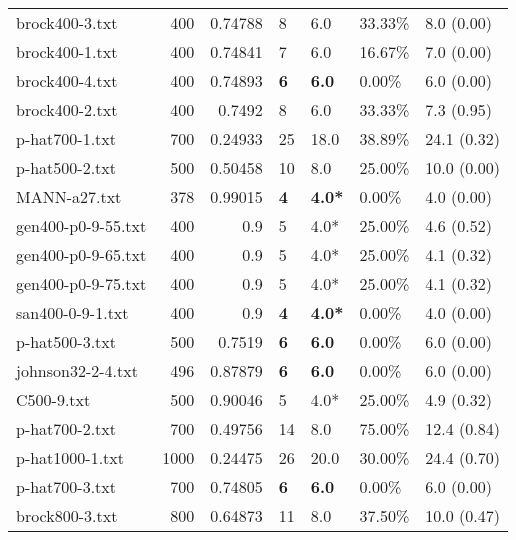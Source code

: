 \begin{table}[h]
\begin{tabular}{lrrllll}
 brock400-3.txt     &     400 &     0.74788 & 8            & 6.0             & 33.33\%  & 8.0 (0.00)     \\
 brock400-1.txt     &     400 &     0.74841 & 7            & 6.0             & 16.67\%  & 7.0 (0.00)     \\
 brock400-4.txt     &     400 &     0.74893 & \textbf{6}   & \textbf{6.0}    & 0.00\%   & 6.0 (0.00)     \\
 brock400-2.txt     &     400 &     0.7492  & 8            & 6.0             & 33.33\%  & 7.3 (0.95)     \\
 p-hat700-1.txt     &     700 &     0.24933 & 25           & 18.0            & 38.89\%  & 24.1 (0.32)    \\
 p-hat500-2.txt     &     500 &     0.50458 & 10           & 8.0             & 25.00\%  & 10.0 (0.00)    \\
 MANN-a27.txt       &     378 &     0.99015 & \textbf{4}   & \textbf{4.0*}   & 0.00\%   & 4.0 (0.00)     \\
 gen400-p0-9-55.txt &     400 &     0.9     & 5            & 4.0*            & 25.00\%  & 4.6 (0.52)     \\
 gen400-p0-9-65.txt &     400 &     0.9     & 5            & 4.0*            & 25.00\%  & 4.1 (0.32)     \\
 gen400-p0-9-75.txt &     400 &     0.9     & 5            & 4.0*            & 25.00\%  & 4.1 (0.32)     \\
 san400-0-9-1.txt   &     400 &     0.9     & \textbf{4}   & \textbf{4.0*}   & 0.00\%   & 4.0 (0.00)     \\
 p-hat500-3.txt     &     500 &     0.7519  & \textbf{6}   & \textbf{6.0}    & 0.00\%   & 6.0 (0.00)     \\
 johnson32-2-4.txt  &     496 &     0.87879 & \textbf{6}   & \textbf{6.0}    & 0.00\%   & 6.0 (0.00)     \\
 C500-9.txt         &     500 &     0.90046 & 5            & 4.0*            & 25.00\%  & 4.9 (0.32)     \\
 p-hat700-2.txt     &     700 &     0.49756 & 14           & 8.0             & 75.00\%  & 12.4 (0.84)    \\
 p-hat1000-1.txt    &    1000 &     0.24475 & 26           & 20.0            & 30.00\%  & 24.4 (0.70)    \\
 p-hat700-3.txt     &     700 &     0.74805 & \textbf{6}   & \textbf{6.0}    & 0.00\%   & 6.0 (0.00)     \\
 brock800-3.txt     &     800 &     0.64873 & 11           & 8.0             & 37.50\%  & 10.0 (0.47)    \\

\end{tabular}
\end{table}
